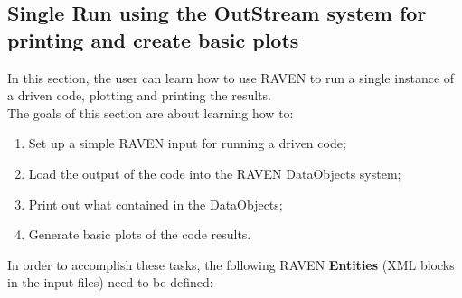 \subsection{Single Run using the OutStream system for printing and create basic plots}
\label{sub:SingleRunBasicPlots}
 In this section, the user can learn how to use RAVEN to run a single instance of a driven code, plotting and printing the 
 results.
 \\ The goals of this section are about learning how to:
 \begin{enumerate}
   \item Set up a simple RAVEN input for running a driven code;
   \item Load the output of the code into the RAVEN DataObjects system;
   \item Print out what contained in the DataObjects;
   \item Generate basic plots of the code results.
\end{enumerate}  
In order to accomplish these tasks, the following RAVEN \textbf{Entities} (XML blocks in the input files) need to be defined:
